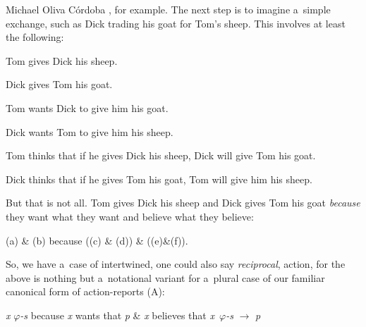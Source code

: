 \begin{artengenv}{Michael Oliva Córdoba}
{%
\parencite*[][]{lemmon_begining_1965}, %
 for example.}
\vspace{-.09cm}
The next step is to imagine a~simple exchange, such as Dick trading his goat for Tom's sheep. This involves at least the following:
\begin{description}[font=\normalfont, labelindent=0pt, leftmargin=!, labelwidth=1cm]
  \item[(a)] Tom gives Dick his sheep.
  \item[(b)] Dick gives Tom his goat.
  \item[(c)] Tom wants Dick to give him his goat.
  \item[(d)] Dick wants Tom to give him his sheep.
  \item[(e)] Tom thinks that if he gives Dick his sheep, Dick will give Tom his goat.
  \item[(f)] Dick thinks that if he gives Tom his goat, Tom will give him his sheep.
\end{description}
\vspace{-.09cm}


%
%
%
%
%
%
%
%
%
%
%
%
%
%
%
%
%
%
%
%
%
%
%
%
%
%
%
%


\noindent But that is not all. Tom gives Dick his sheep and Dick gives Tom his goat \textit{because} they want what they want and believe what they believe:
\vspace{-.6cm}
\begin{description}[font=\normalfont, labelindent=0pt, leftmargin=!, labelwidth=1cm]
  \item[(TD*)] (a) \& (b) because ((c) \& (d)) \& ((e)\&(f)).
\end{description}
\vspace{-.09cm}

%



\noindent So, we have a~case of intertwined, one could also say \textit{reciprocal}, action, for the above is nothing but a~notational variant for a~plural case of our familiar canonical form of action-reports (A):
\vspace{-.09cm}
\begin{description}[font=\normalfont, labelindent=0pt, leftmargin=!, labelwidth=1cm]
  \item[(A)] \textit{x} \textit{$\varphi $-s} because \textit{x} wants that \textit{p} \& \textit{x} believes that \textit{x~$\varphi $-s} $\to$ \textit{p}
\end{description}
\vspace{-.09cm}


\end{artengenv}
